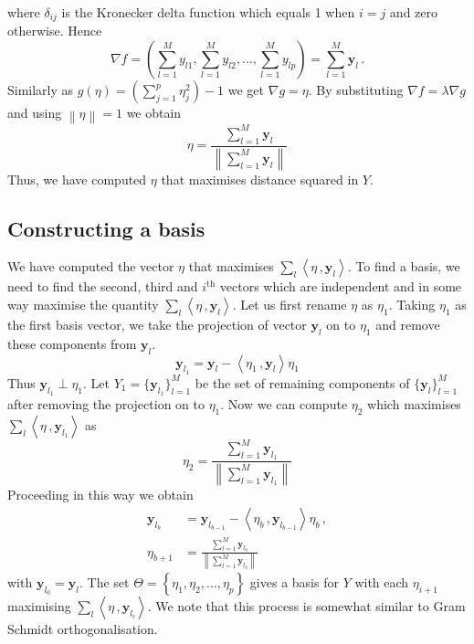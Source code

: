 \documentclass[a4paper,11pt]{article}
\begin{document}
where $\delta_{ij}$ is the Kronecker delta function which equals 1 when $i=j$ and zero otherwise. Hence
\begin{equation}\label{eq:secMF8}
    \nabla f = \left(\sum_{l=1}^M y_{l1}, \sum_{l=1}^M y_{l2}, \ldots, \sum_{l=1}^M y_{lp}   \right) = \sum_{l=1}^M \bm{y}_l \, .
\end{equation}
Similarly as $g(\eta) = \left( \sum_{j=1}^p \eta_j^2\right) - 1$  we get $\nabla g = \eta$. By substituting  $\nabla f = \lambda \nabla g$ and using $\left\lVert \eta \right\rVert = 1 $ we obtain
\begin{equation}\label{eq:secMF9}
    \eta = \frac{\sum_{l=1}^M \bm{y}_l }{  \left\lVert\sum_{l=1}^M \bm{y}_l  \right\rVert  }
\end{equation}
Thus, we have computed $\eta$ that maximises distance squared in $Y$.  

\subsection{Constructing a basis}\label{sec:MathFrame3}
We have computed the vector $\eta$ that maximises $\sum_{l}\left\langle \eta\, ,  \bm{y}_{l} \right\rangle$. To find a basis,  we need to find the second, third and $i^{\text{th}}$ vectors which are independent and in some way maximise the quantity $\sum_{l}\left\langle \eta\, ,  \bm{y}_{l} \right\rangle$.  Let us first rename $\eta$ as $\eta_1$. Taking $\eta_1$ as the first basis vector, we take the projection of vector $\bm{y}_l$ on to $\eta_1$  and remove these components from $\bm{y}_l$. 
\begin{equation}\label{eq:secMF10}
    \bm{y}_{l_1} = \bm{y}_l - \left\langle \eta_1 \, , \bm{y}_l \right \rangle \eta_1
\end{equation}
Thus $\bm{y}_{l_1} \perp \eta_1$. Let $Y_1 = \{\bm{y}_{l_1} \}_{l=1}^M $ be the set of remaining components of $\{ \bm{y}_l \}_{l=1}^M$ after removing the projection on to $\eta_1$. Now we can compute $\eta_2$ which maximises $\sum_{l}\left\langle \eta\, ,  \bm{y}_{l_1} \right\rangle$ as
\begin{equation}\label{eq:secMF11}
    \eta_2 = \frac{\sum_{l=1}^M \bm{y}_{l_1} }{  \left\lVert\sum_{l=1}^M \bm{y}_{l_1}  \right\rVert  } 
\end{equation}
Proceeding in this way we obtain 
\begin{align}
    \bm{y}_{l_{b}} & = \bm{y}_{l_{b-1}} - \left\langle \eta_b \, , \bm{y}_{l_{b-1}} \right \rangle \eta_b \, , \label{eq:secMF12} \\
     \eta_{b+1} & = \frac{\sum_{l=1}^M \bm{y}_{l_b} }{  \left\lVert\sum_{l=1}^M \bm{y}_{l_b}  \right\rVert  } \label{eq:secMF13}
\end{align}
with $\bm{y}_{l_0} = \bm{y}_{l}$. The set $\Theta = \left\{ \eta_1, \eta_2, \ldots , \eta_p  \right\}$ gives a basis for $Y$ with each $\eta_{i+1}$ maximising $\sum_{l}\left\langle \eta\, ,  \bm{y}_{l_i} \right\rangle$. %
We note that this process is somewhat similar to Gram Schmidt orthogonalisation.  \\
\end{document}
